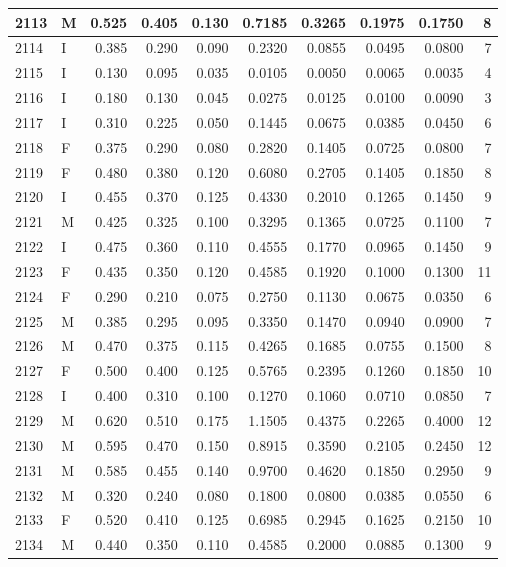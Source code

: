\documentclass[9pt,twocolumn,twoside,]{pnas-new}
\begin{document}
\begin{tabular}{l|l|r|r|r|r|r|r|r|r}
\hline
2113 & M & 0.525 & 0.405 & 0.130 & 0.7185 & 0.3265 & 0.1975 & 0.1750 & 8\\
\hline
2114 & I & 0.385 & 0.290 & 0.090 & 0.2320 & 0.0855 & 0.0495 & 0.0800 & 7\\
\hline
2115 & I & 0.130 & 0.095 & 0.035 & 0.0105 & 0.0050 & 0.0065 & 0.0035 & 4\\
\hline
2116 & I & 0.180 & 0.130 & 0.045 & 0.0275 & 0.0125 & 0.0100 & 0.0090 & 3\\
\hline
2117 & I & 0.310 & 0.225 & 0.050 & 0.1445 & 0.0675 & 0.0385 & 0.0450 & 6\\
\hline
2118 & F & 0.375 & 0.290 & 0.080 & 0.2820 & 0.1405 & 0.0725 & 0.0800 & 7\\
\hline
2119 & F & 0.480 & 0.380 & 0.120 & 0.6080 & 0.2705 & 0.1405 & 0.1850 & 8\\
\hline
2120 & I & 0.455 & 0.370 & 0.125 & 0.4330 & 0.2010 & 0.1265 & 0.1450 & 9\\
\hline
2121 & M & 0.425 & 0.325 & 0.100 & 0.3295 & 0.1365 & 0.0725 & 0.1100 & 7\\
\hline
2122 & I & 0.475 & 0.360 & 0.110 & 0.4555 & 0.1770 & 0.0965 & 0.1450 & 9\\
\hline
2123 & F & 0.435 & 0.350 & 0.120 & 0.4585 & 0.1920 & 0.1000 & 0.1300 & 11\\
\hline
2124 & F & 0.290 & 0.210 & 0.075 & 0.2750 & 0.1130 & 0.0675 & 0.0350 & 6\\
\hline
2125 & M & 0.385 & 0.295 & 0.095 & 0.3350 & 0.1470 & 0.0940 & 0.0900 & 7\\
\hline
2126 & M & 0.470 & 0.375 & 0.115 & 0.4265 & 0.1685 & 0.0755 & 0.1500 & 8\\
\hline
2127 & F & 0.500 & 0.400 & 0.125 & 0.5765 & 0.2395 & 0.1260 & 0.1850 & 10\\
\hline
2128 & I & 0.400 & 0.310 & 0.100 & 0.1270 & 0.1060 & 0.0710 & 0.0850 & 7\\
\hline
2129 & M & 0.620 & 0.510 & 0.175 & 1.1505 & 0.4375 & 0.2265 & 0.4000 & 12\\
\hline
2130 & M & 0.595 & 0.470 & 0.150 & 0.8915 & 0.3590 & 0.2105 & 0.2450 & 12\\
\hline
2131 & M & 0.585 & 0.455 & 0.140 & 0.9700 & 0.4620 & 0.1850 & 0.2950 & 9\\
\hline
2132 & M & 0.320 & 0.240 & 0.080 & 0.1800 & 0.0800 & 0.0385 & 0.0550 & 6\\
\hline
2133 & F & 0.520 & 0.410 & 0.125 & 0.6985 & 0.2945 & 0.1625 & 0.2150 & 10\\
\hline
2134 & M & 0.440 & 0.350 & 0.110 & 0.4585 & 0.2000 & 0.0885 & 0.1300 & 9\\

\end{tabular}
\end{document}
